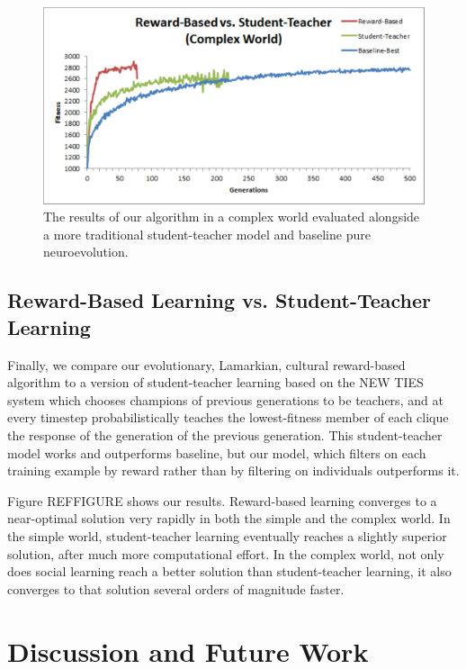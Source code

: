 \documentclass{acm_proc_article-sp}
\begin{document}
\begin{figure}
  \centering
    \includegraphics[scale=.35]{reward_based_vs_student_teacher.pdf}
  \caption{The results of our algorithm in a complex world evaluated alongside a more traditional student-teacher model and baseline pure neuroevolution.}
  \label{fig:reward-studetteacher}
\end{figure}

\subsection*{Reward-Based Learning vs. Student-Teacher Learning}
Finally, we compare our evolutionary, Lamarkian, cultural reward-based algorithm to a version of student-teacher learning based on the NEW TIES system \cite{haasdijk2008social} which chooses champions of previous generations to be teachers, and at every timestep probabilistically teaches the lowest-fitness member of each clique the response of the generation of the previous generation.  This student-teacher model works and outperforms baseline, but our model, which filters on each training example by reward rather than by filtering on individuals outperforms it.

Figure REFFIGURE shows our results.  Reward-based learning converges to a near-optimal solution very rapidly in both the simple and the complex world.  In the simple world, student-teacher learning eventually reaches a slightly superior solution, after much more computational effort.  In the complex world, not only does social learning reach a better solution than student-teacher learning, it also converges to that solution several orders of magnitude faster.  

\section{Discussion and Future Work}
\label{sec:future}
\end{document}
